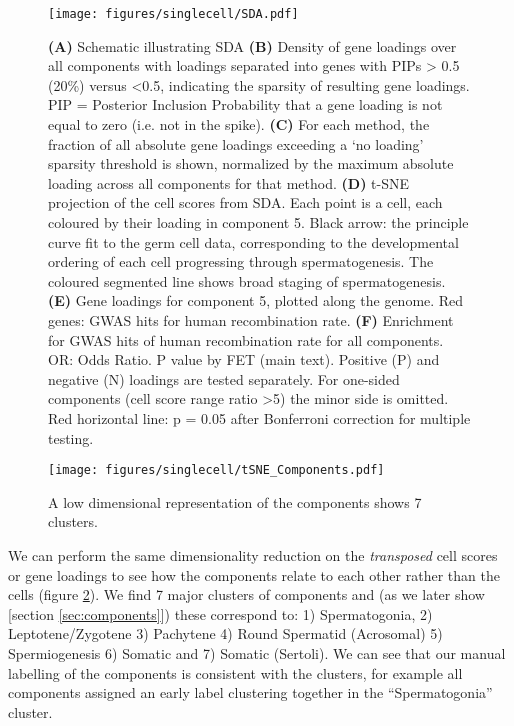 \begin{figure}[H]
	\centering
	\texttt{[image: figures/singlecell/SDA.pdf]}
	\caption[SDA]{
		\textbf{(A)} Schematic illustrating SDA
		\textbf{(B)} Density of gene loadings over all components with loadings separated into genes with PIPs > 0.5 (20\%) versus <0.5, indicating the sparsity of resulting gene loadings.
			PIP = Posterior Inclusion Probability that a gene loading is not equal to zero (i.e. not in the spike).
		\textbf{(C)} For each method, the fraction of all absolute gene loadings exceeding a ‘no loading’ sparsity threshold is shown, normalized by the maximum absolute loading across all components for that method.
		\textbf{(D)} t-SNE projection of the cell scores from SDA.
			Each point is a cell, each coloured by their loading in component 5.
			Black arrow: the principle curve fit to the germ cell data, corresponding to the developmental ordering of each cell progressing through spermatogenesis.
			The coloured segmented line shows broad staging of spermatogenesis.
		\textbf{(E)} Gene loadings for component 5, plotted along the genome.
			Red genes: GWAS hits for human recombination rate.
		\textbf{(F)} Enrichment for GWAS hits of human recombination rate for all components.
			OR: Odds Ratio.
			P value by FET (main text).
			Positive (P) and negative (N) loadings are tested separately.
			For one-sided components (cell score range ratio >5) the minor side is omitted.
			Red horizontal line: p = 0.05 after Bonferroni correction for multiple testing.
	}
	\label{fig:SDA}
\end{figure}

\begin{figure}[H]
	\centering
	\texttt{[image: figures/singlecell/tSNE\_Components.pdf]}
	\caption[t-SNE of Components]{A low dimensional representation of the components shows 7 clusters.}
	\label{fig:tSNE_Components}
\end{figure}


We can perform the same dimensionality reduction on the \emph{transposed} cell scores or gene loadings to see how the components relate to each other rather than the cells (figure \ref{fig:tSNE_Components}).
We find 7 major clusters of components and (as we later show [section \ref{sec:components}]) these correspond to: 1) Spermatogonia, 2) Leptotene/Zygotene 3) Pachytene 4) Round Spermatid (Acrosomal) 5) Spermiogenesis 6) Somatic and 7) Somatic (Sertoli).
We can see that our manual labelling of the components is consistent with the clusters, for example all components assigned an early label clustering together in the ``Spermatogonia'' cluster.

